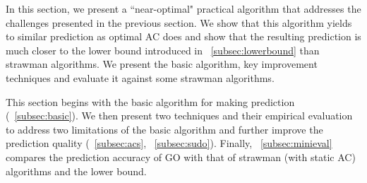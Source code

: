 \label{sec:prediction}
In this section, we present a ``near-optimal" practical algorithm that addresses the challenges presented in the previous section. We show that this algorithm yields to similar prediction as optimal AC does and show that the resulting prediction is much closer to the lower bound introduced in \Section~\ref{subsec:lowerbound} than strawman algorithms. We present the basic algorithm, key improvement techniques and evaluate it against some strawman algorithms. 

This section begins with the basic algorithm for making prediction (\Section~\ref{subsec:basic}). We then present two techniques and their empirical evaluation to address two limitations of the basic algorithm and further improve the prediction quality (\Section~\ref{subsec:acs}, \Section~\ref{subsec:sudo}). Finally, \Section~\ref{subsec:minieval} compares the prediction accuracy of GO with that of strawman (with static AC) algorithms and the lower bound.


